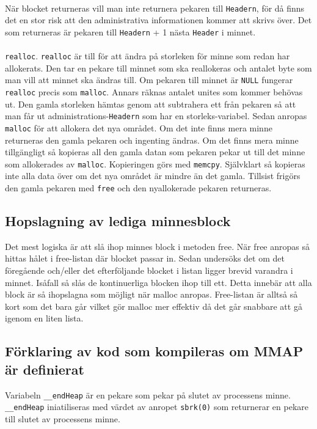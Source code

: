 \documentclass[a4paper]{article}
\begin{document}
\\
När blocket returneras vill man inte returnera pekaren till \texttt{Headern}, för då finns det en stor risk att den administrativa informationen kommer att skrivs över. Det som returneras är pekaren till \texttt{Headern} + 1 nästa \texttt{Header} i minnet.
\\\\
\texttt{realloc}. \texttt{realloc} är till för att ändra på storleken för minne som redan har allokerats. Den tar en pekare till minnet som ska reallokeras och antalet byte som man vill att minnet ska ändras till. Om pekaren till minnet är \texttt{NULL} fungerar \texttt{realloc} precis som \texttt{malloc}. Annars räknas antalet unites som kommer behövas ut. Den gamla storleken hämtas genom att subtrahera ett från pekaren så att man får ut administrations-\texttt{Headern} som har en storleks-variabel. Sedan anropas \texttt{malloc} för att allokera det nya området. Om det inte finns mera minne returneras den gamla pekaren och ingenting ändras. Om det finns mera minne tillgängligt så kopieras all den gamla datan som pekaren pekar ut till det minne som allokerades av \texttt{malloc}. Kopieringen görs med \texttt{memcpy}. Självklart så kopieras inte alla data över om det nya området är mindre än det gamla. Tillsist frigörs den gamla pekaren med \texttt{free} och den nyallokerade pekaren returneras. 


\subsection*{Hopslagning av lediga minnesblock }
Det mest logiska är att slå ihop minnes block i metoden free. När free anropas så hittas hålet i free-listan där blocket passar in. Sedan undersöks det om det föregående och/eller det efterföljande blocket i listan ligger brevid varandra i minnet. Isåfall så slås de kontinuerliga blocken ihop till ett. Detta innebär att alla block är så ihopslagna som möjligt när malloc anropas. Free-listan är alltså så kort som det bara går vilket gör malloc mer effektiv då det går snabbare att gå igenom en liten lista.

\subsection*{Förklaring av kod som kompileras om MMAP är definierat}

Variabeln \texttt{\_\_endHeap} är en pekare som pekar på slutet av processens minne. \texttt{\_\_endHeap} iniatiliseras med värdet av anropet \texttt{sbrk(0)} som returnerar en pekare till slutet av processens minne.
\end{document}
